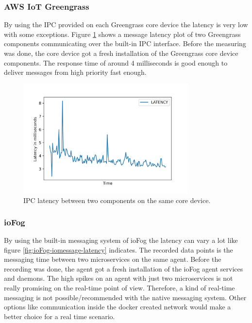 \subsubsection*{AWS IoT Greengrass}
By using the \gls{IPC} provided on each Greengrass core device the latency is very low with some exceptions. Figure \ref{fig:aws-iomessage-latency} shows a message latency plot of two Greengrass components communicating over the built-in \gls{IPC} interface. Before the measuring was done, the core device got a fresh installation of the Greengrass core device components. The response time of around 4 milliseconds is good enough to deliver messages from high priority fast enough.

\begin{figure}[H]
    \centering
    \includegraphics[width=0.8\textwidth]{assets/aws-greengrass/latency/plots/latency.png}
    \caption{IPC latency between two components on the same core device.}\label{fig:aws-iomessage-latency}
\end{figure}

\subsubsection*{ioFog}
By using the built-in messaging system of ioFog the latency can vary a lot like figure \ref{fig:ioFog-iomessage-latency} indicates. The recorded data points is the messaging time between two microservices on the same agent. Before the recording was done, the agent got a fresh installation of the ioFog agent services and daemons. The high spikes on an agent with just two microservices is not really promising on the real-time point of view. Therefore, a kind of real-time messaging is not possible/recommended with the native messaging system. Other options like communication inside the docker created network would make a better choice for a real time scenario.

